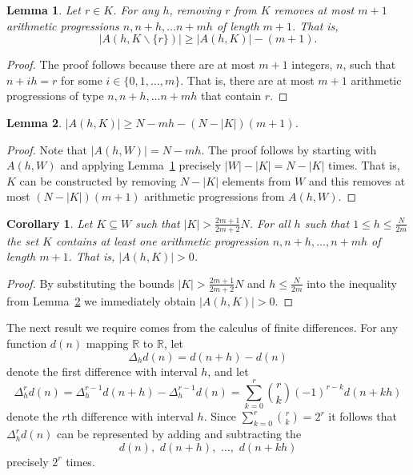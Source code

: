 \documentclass[aap]{imsart}
\newcommand{\reals}{{\mathbb R}}
\newtheorem{corollary}{Corollary}
\newtheorem{lemma}{Lemma}
\begin{document}
\begin{lemma} \label{lem:S(h,G/r)size}
Let $r \in K$.  For any $h$, removing $r$ from $K$ removes at most $m+1$ arithmetic progressions $n, n+h, \dots n+mh$ of length $m+1$.  That is,
\[
|A(h,K \backslash \{r\})| \geq |A(h,K)| - (m+1).
\]
\end{lemma}
\begin{proof}
The proof follows because there are at most $m+1$ integers, $n$, such that $n+ih = r$ for some $i \in \{0,1,\dots,m\}$.  That is, there are at most $m+1$ arithmetic progressions of type $n, n+h, \dots n+mh$ that contain $r$.
\end{proof}

 \begin{lemma} \label{lem:S(h,K)size}
 $|A(h,K)| \geq N - mh - (N - |K|)(m+1)$.
 \end{lemma}
 \begin{proof}
 Note that $|A(h,W)| = N - mh$.  The proof follows by starting with $A(h,W)$ and applying Lemma~\ref{lem:S(h,G/r)size} precisely $|W|-|K|=N-|K|$ times. That is, $K$ can be constructed by removing $N - |K|$ elements from $W$ and this removes at most $(N - |K|)(m+1)$ arithmetic progressions from $A(h,W)$.
 \end{proof}
 
 \begin{corollary} \label{cor:S(h,K)>0}
 Let $K \subseteq W$ such that $|K| > \frac{2m+1}{2m+2}N$. For all $h$ such that $1\leq h \leq\frac{N}{2m}$ the set $K$ contains at least one arithmetic progression $n, n+h, \dots, n+mh$ of length $m+1$. That is, $|A(h,K)| > 0$.
 \end{corollary}
 \begin{proof}
 By substituting the bounds $|K| > \frac{2m+1}{2m+2}N$ and $h \leq\frac{N}{2m}$ into the inequality from Lemma~\ref{lem:S(h,K)size} we immediately obtain $|A(h,K)| > 0$.
 \end{proof}

The next result we require comes from the calculus of finite differences. For any function $d(n)$ mapping $\reals$ to $\reals$, let 
\[
\Delta_h d(n) = d(n+h) - d(n)
\] 
denote the first difference with interval $h$, and let
\begin{equation}\label{eq:mthdiffformula}
\Delta_h^r d(n) = \Delta_h^{r-1} d(n+h) - \Delta_h^{r-1} d(n) = \sum_{k=0}^{r}\binom{r}{k}(-1)^{r-k}d(n+kh)
\end{equation}
denote the $r$th difference with interval $h$. Since $\sum_{k=0}^{r}\binom{r}{k} = 2^r$ it follows that $\Delta_h^r d(n)$ can be represented by adding and subtracting the 
\[
d(n), \,\, d(n+h), \,\, \dots, \,\, d(n+kh)
\] 
precisely $2^r$ times.
\end{document}
